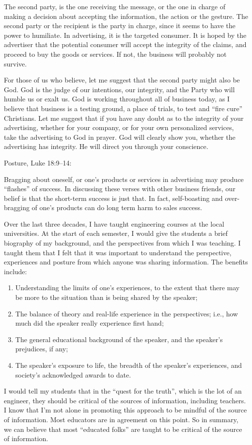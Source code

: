 \documentclass[12pt]{memoir}
\begin{document}
The second party, is the one receiving the message, or the one in
charge of making a decision about accepting the information, the action
or the gesture. The second party or the recipient is the party in
charge, since it seems to have the power to humiliate. In advertising,
it is the targeted consumer. It is hoped by the advertiser that the
potential consumer will accept the integrity of the claims, and proceed
to buy the goods or services. If not, the business will probably not
survive.

For those of us who believe, let me suggest that the second party
might also be God. God is the judge of our intentions, our integrity,
and the Party who will humble us or exalt us. God is working throughout
all of business today, as I believe that business is a testing ground,
a place of trials, to test and ``fire cure'' Christians. Let me
suggest that if you have any doubt as to the integrity of your advertising,
whether for your company, or for your own personalized services, take
the advertising to God in prayer. God will clearly show you, whether
the advertising has integrity. He will direct you through your conscience.

Posture, Luke 18:9--14:

Bragging about oneself, or one's products or services in advertising
may produce ``flashes'' of success. In discussing these verses with
other business friends, our belief is that the short-term success
is just that. In fact, self-boasting and over-bragging of one's products
can do long term harm to sales success. 

Over the last three decades, I have taught engineering courses at
the local universities. At the start of each semester, I would give
the students a brief biography of my background, and the perspectives
from which I was teaching. I taught them that I felt that it was important
to understand the perspective, experiences and posture from which
anyone was sharing information. The benefits include:
\begin{enumerate}
\item Understanding the limits of one's experiences, to the extent that
there may be more to the situation than is being shared by the speaker; 
\item The balance of theory and real-life experience in the perspectives;
i.e., how much did the speaker really experience first hand; 
\item The general educational background of the speaker, and the speaker's
prejudices, if any; 
\item The speaker's exposure to life, the breadth of the speaker's experiences,
and society's acknowledged awards to date. 
\end{enumerate}
I would tell my students that in the ``quest for the truth'', which
is the lot of an engineer, they should be critical of the sources
of information, including teachers. I know that I'm not alone in promoting
this approach to be mindful of the source of information. Most educators
are in agreement on this point. So in summary, we can believe that
most ``educated folks'' are taught to be critical of the source
of information.
\end{document}
